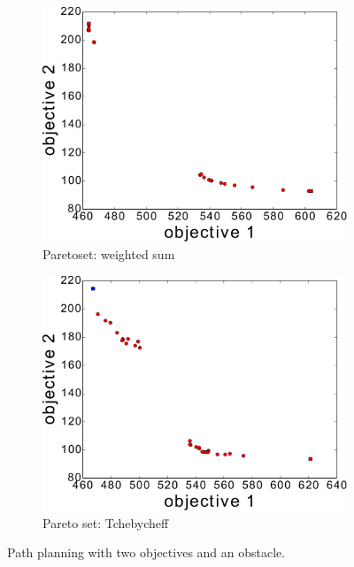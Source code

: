 \documentclass{article}
\begin{document}
\begin{figure}[h!]
\begin{subfigure}[b]{0.3\linewidth}
		\includegraphics[width=\textwidth]{fig/sim4-obstacle/PF04-MORRT.pdf}
		\caption{Paretoset: weighted sum}
		\label{fig:sim:obs:pf:a}
	\end{subfigure}
	\begin{subfigure}[b]{0.3\linewidth}
		\centering
		\includegraphics[width=\textwidth]{fig/sim5-obstacle/PF05-MORRT2.pdf}
		\caption{Pareto set: Tchebycheff}
		\label{fig:sim:obs:pf:b}
	\end{subfigure} 
	\caption{Path planning with two objectives and an obstacle.}
	\label{fig:sim:obs}
\end{figure}
\end{document}
